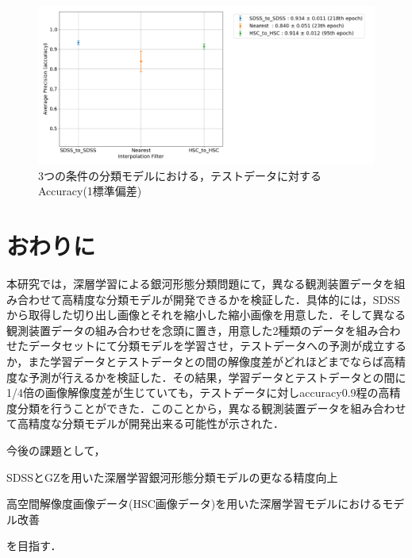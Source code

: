 \documentclass[a4j, 11pt]{jreport}
\begin{document}
\begin{figure}[H]
  \centering
  \includegraphics[width=1.0\hsize, keepaspectratio]{images/6syou/acc_with_errorbar_auto_epoch.png}
  \caption{3つの条件の分類モデルにおける，テストデータに対するAccuracy(1標準偏差)}
  \label{fig:6syou_zikkenn}
\end{figure}


\newpage
\chapter{おわりに}
本研究では，深層学習による銀河形態分類問題にて，異なる観測装置データを組み合わせて高精度な分類モデルが開発できるかを検証した．具体的には，SDSSから取得した切り出し画像とそれを縮小した縮小画像を用意した．そして異なる観測装置データの組み合わせを念頭に置き，用意した2種類のデータを組み合わせたデータセットにて分類モデルを学習させ，テストデータへの予測が成立するか，また学習データとテストデータとの間の解像度差がどれほどまでならば高精度な予測が行えるかを検証した．その結果，学習データとテストデータとの間に1/4倍の画像解像度差が生じていても，テストデータに対しaccuracy0.9程の高精度分類を行うことができた．このことから，異なる観測装置データを組み合わせて高精度な分類モデルが開発出来る可能性が示された．

今後の課題として，
\begin{inparaenum}[(1)]
 \item SDSSとGZを用いた深層学習銀河形態分類モデルの更なる精度向上
 \item 高空間解像度画像データ(HSC画像データ)を用いた深層学習モデルにおけるモデル改善
\end{inparaenum}
を目指す．

\end{document}
